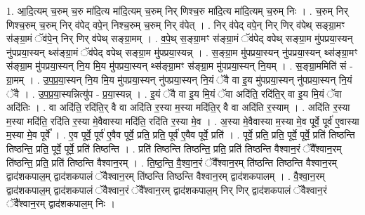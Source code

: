 \documentclass[17pt]{extarticle}
\begin{document}
1. आ॒दि॒त्यम् च॒रुम् च॒रु मा॑दि॒त्य मा॑दि॒त्यम् च॒रुम् निर् णिश्च॒रु मा॑दि॒त्य मा॑दि॒त्यम् च॒रुम् निः । . च॒रुम् निर् णिश्च॒रुम् च॒रुम् निर् व॑पेद् वपे॒न् निश्च॒रुम् च॒रुम् निर् व॑पेत् । . निर् व॑पेद् वपे॒न् निर् णिर् व॑पेथ् सङ्ग्रा॒मꣳ स॑ङ्ग्रा॒मं ॅव॑पे॒न् निर् णिर् व॑पेथ् सङ्ग्रा॒मम् । . व॒पे॒थ् स॒ङ्ग्रा॒मꣳ स॑ङ्ग्रा॒मं ॅव॑पेद् वपेथ् सङ्ग्रा॒म मु॑पप्रया॒स्यन् नु॑पप्रया॒स्यन् थ्स॑ङ्ग्रा॒मं ॅव॑पेद् वपेथ् सङ्ग्रा॒म मु॑पप्रया॒स्यन्न् । . स॒ङ्ग्रा॒म मु॑पप्रया॒स्यन् नु॑पप्रया॒स्यन् थ्स॑ङ्ग्रा॒मꣳ स॑ङ्ग्रा॒म मु॑पप्रया॒स्यन् नि॒य मि॒य मु॑पप्रया॒स्यन् थ्स॑ङ्ग्रा॒मꣳ स॑ङ्ग्रा॒म मु॑पप्रया॒स्यन् नि॒यम् । . स॒ङ्ग्रा॒ममिति॑ सं - ग्रा॒मम् । . उ॒प॒प्र॒या॒स्यन् नि॒य मि॒य मु॑पप्रया॒स्यन् नु॑पप्रया॒स्यन् नि॒यं ॅवै वा इ॒य मु॑पप्रया॒स्यन् नु॑पप्रया॒स्यन् नि॒यं ॅवै । . उ॒प॒प्र॒या॒स्यन्नित्यु॑प - प्र॒या॒स्यन्न् । . इ॒यं ॅवै वा इ॒य मि॒यं ॅवा अदि॑ति॒ रदि॑ति॒र् वा इ॒य मि॒यं ॅवा अदि॑तिः । . वा अदि॑ति॒ रदि॑ति॒र् वै वा अदि॑ति र॒स्या म॒स्या मदि॑ति॒र् वै वा अदि॑ति र॒स्याम् । . अदि॑ति र॒स्या म॒स्या मदि॑ति॒ रदि॑ति र॒स्या मे॒वैवास्या मदि॑ति॒ रदि॑ति र॒स्या मे॒व । . अ॒स्या मे॒वैवास्या म॒स्या मे॒व पूर्वे॒ पूर्व॑ ए॒वास्या म॒स्या मे॒व पूर्वे᳚ । . ए॒व पूर्वे॒ पूर्व॑ ए॒वैव पूर्वे॒ प्रति॒ प्रति॒ पूर्व॑ ए॒वैव पूर्वे॒ प्रति॑ । . पूर्वे॒ प्रति॒ प्रति॒ पूर्वे॒ पूर्वे॒ प्रति॑ तिष्ठन्ति तिष्ठन्ति॒ प्रति॒ पूर्वे॒ पूर्वे॒ प्रति॑ तिष्ठन्ति । . प्रति॑ तिष्ठन्ति तिष्ठन्ति॒ प्रति॒ प्रति॑ तिष्ठन्ति वैश्वान॒रं ॅवै᳚श्वान॒रम् ति॑ष्ठन्ति॒ प्रति॒ प्रति॑ तिष्ठन्ति वैश्वान॒रम् । . ति॒ष्ठ॒न्ति॒ वै॒श्वा॒न॒रं ॅवै᳚श्वान॒रम् ति॑ष्ठन्ति तिष्ठन्ति वैश्वान॒रम् द्वाद॑शकपाल॒म् द्वाद॑शकपालं ॅवैश्वान॒रम् ति॑ष्ठन्ति तिष्ठन्ति वैश्वान॒रम् द्वाद॑शकपालम् । . वै॒श्वा॒न॒रम् द्वाद॑शकपाल॒म् द्वाद॑शकपालं ॅवैश्वान॒रं ॅवै᳚श्वान॒रम् द्वाद॑शकपाल॒म् निर् णिर् द्वाद॑शकपालं ॅवैश्वान॒रं ॅवै᳚श्वान॒रम् द्वाद॑शकपाल॒म् निः । \newline
\end{document}
